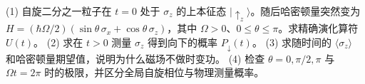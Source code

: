 (1) 自旋二分之一粒子在 \(t=0\) 处于 \(\sigma_z\) 的上本征态 \(|\uparrow_z\rangle\)。随后哈密顿量突然变为 \(H=(\hbar\Omega/2)(\sin\theta\,\sigma_x+\cos\theta\,\sigma_z)\)，其中 \(\Omega>0\)、\(0\le\theta\le\pi\)。求精确演化算符 \(U(t)\)。
(2) 求在 \(t>0\) 测量 \(\sigma_z\) 得到向下的概率 \(P_{\downarrow}(t)\)。
(3) 求随时间的 \(\langle\sigma_z\rangle\) 和哈密顿量期望值，说明为什么磁场不做时变功。
(4) 检查 \(\theta=0,\pi/2,\pi\) 与 \(\Omega t=2\pi\) 时的极限，并区分全局自旋相位与物理测量概率。
